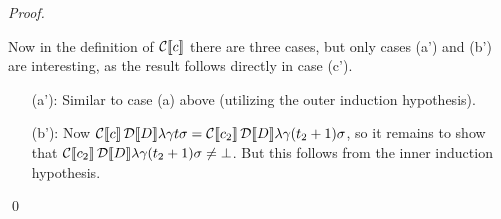 \documentclass[orivec,final]{llncs-href}
\newcommand{\trace}{\sigma}
\begin{document}
\begin{proof}
\begin{itemize}
\begin{itemize}[]
      Now in the definition of $\mathcal{C}\!\left\llbracket c \right\rrbracket    $ there are
      three cases, but only cases (a') and (b') are interesting, as the
      result follows directly in case (c').
      \begin{itemize}
      \item[(a'):] Similar to case (a) above (utilizing the outer
        induction hypothesis).
      \item[(b'):] Now
        $\cdenclause{c}{\cdencontext{D}}{\lambda}{\gamma}{t}{\trace}
        =
        \cdenclause{c_2}{\cdencontext{D}}{\lambda}{\gamma}{(t_2+1)}{\trace}$,
        so it remains to show
        that $\cdenclause{c_2}{\cdencontext{D}}{\lambda}{\gamma}{(t_2+1)}{\trace}
        \neq \bot$. But this follows from the inner induction hypothesis.
      \end{itemize}
    \end{itemize}
  \end{itemize}
  \qed
\end{proof}
\end{document}
